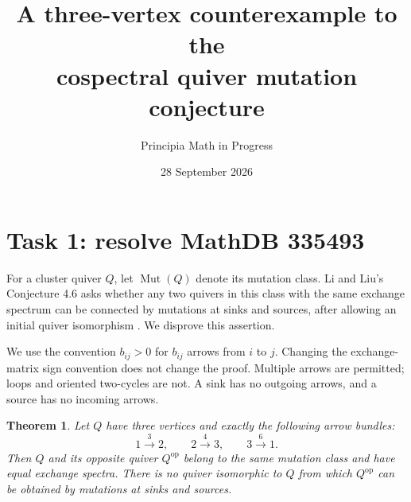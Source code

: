 \documentclass[11pt]{article}
\title{A three-vertex counterexample to the\protect\\cospectral quiver mutation conjecture}
\author{Principia Math in Progress}
\date{28 September 2026}
\newtheorem{theorem}{Theorem}
\begin{document}
\maketitle

\section*{Task 1: resolve MathDB 335493}
For a cluster quiver $Q$, let $\operatorname{Mut}(Q)$ denote its mutation
class. Li and Liu's Conjecture 4.6 asks whether any two quivers in this
class with the same exchange spectrum can be connected by mutations
at sinks and sources, after allowing an initial quiver isomorphism
\cite{LL}. We disprove this assertion.

We use the convention $b_{ij}>0$ for $b_{ij}$ arrows from $i$ to $j$.
Changing the exchange-matrix sign convention does not change the proof.
Multiple arrows are permitted; loops and oriented two-cycles are not.
A sink has no outgoing arrows, and a source has no incoming arrows.

\begin{theorem}
Let $Q$ have three vertices and exactly the following arrow bundles:
\[
1\xrightarrow{\ 3\ }2,\qquad
2\xrightarrow{\ 4\ }3,\qquad
3\xrightarrow{\ 6\ }1.
\]
Then $Q$ and its opposite quiver $Q^{\mathrm{op}}$ belong to the same
mutation class and have equal exchange spectra. There is no quiver
isomorphic to $Q$ from which $Q^{\mathrm{op}}$ can be obtained by
mutations at sinks and sources.
\end{theorem}
\end{document}
